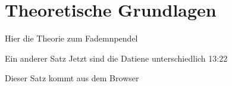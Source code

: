 \section{Theoretische Grundlagen}



Hier die Theorie zum Fademnpendel

Ein anderer Satz
 Jetzt sind die Datiene unterschiedlich 13:22
 
 Dieser Satz kommt aus dem Browser
